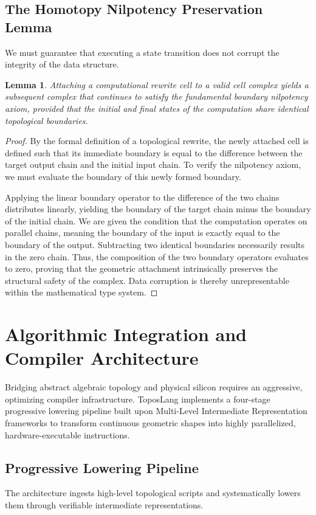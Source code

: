 \documentclass[11pt, a4paper]{article}
\newtheorem{lemma}[theorem]{Lemma}
\begin{document}
\subsection{The Homotopy Nilpotency Preservation Lemma}
We must guarantee that executing a state transition does not corrupt the integrity of the data structure.

\begin{lemma}
Attaching a computational rewrite cell to a valid cell complex yields a subsequent complex that continues to satisfy the fundamental boundary nilpotency axiom, provided that the initial and final states of the computation share identical topological boundaries.
\end{lemma}

\begin{proof}
By the formal definition of a topological rewrite, the newly attached cell is defined such that its immediate boundary is equal to the difference between the target output chain and the initial input chain. To verify the nilpotency axiom, we must evaluate the boundary of this newly formed boundary.

Applying the linear boundary operator to the difference of the two chains distributes linearly, yielding the boundary of the target chain minus the boundary of the initial chain. We are given the condition that the computation operates on parallel chains, meaning the boundary of the input is exactly equal to the boundary of the output. Subtracting two identical boundaries necessarily results in the zero chain. Thus, the composition of the two boundary operators evaluates to zero, proving that the geometric attachment intrinsically preserves the structural safety of the complex. Data corruption is thereby unrepresentable within the mathematical type system.
\end{proof}

\section{Algorithmic Integration and Compiler Architecture}
Bridging abstract algebraic topology and physical silicon requires an aggressive, optimizing compiler infrastructure. ToposLang implements a four-stage progressive lowering pipeline built upon Multi-Level Intermediate Representation frameworks to transform continuous geometric shapes into highly parallelized, hardware-executable instructions.

\subsection{Progressive Lowering Pipeline}
The architecture ingests high-level topological scripts and systematically lowers them through verifiable intermediate representations.
\end{document}

